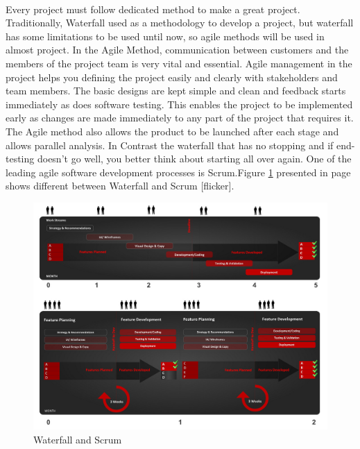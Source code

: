 \documentclass[12pt,a4paper,class,twoside,openany]{report}
\begin{document}
\paragraph*{\hspace{.9 cm} }Every project must follow dedicated method to make a great project. Traditionally, Waterfall  used as a methodology to develop a project, but waterfall has some limitations to be used until now, so agile methods will be used in almost project. In the Agile Method, communication between customers and the members of the project team is very vital and essential. Agile management in the project helps you defining the project easily and clearly with stakeholders and team members. The basic designs are kept simple and clean and feedback starts immediately as does software testing. This enables the project to be implemented early as changes are made immediately to any part of the project that requires it. The Agile method also allows the product to be launched after each stage and allows parallel analysis. In Contrast the waterfall that has no stopping and if end-testing doesn't go well, you better think about starting all over again. One of the leading agile software development processes is Scrum.Figure \ref{fg:2-1} presented in page \pageref{fg:2-1} shows different between Waterfall and Scrum [flicker].
\begin{figure}[htbp]
\begin{center}
\includegraphics[scale=2,angle=90,width=\textwidth]{2-1}
\caption{Waterfall and Scrum }
\label{fg:2-1}
\end{center}
\end{figure}
\end{document}
